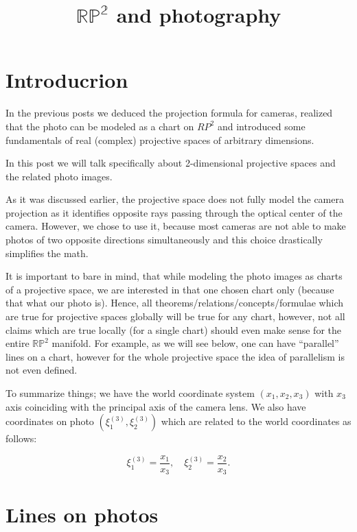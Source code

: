 \documentclass[a4paper,10pt]{article}
\title{$\mathbb{RP^2}$ and photography}
\author{}
\date{}
\begin{document}
\maketitle
\section{Introducrion}

In the previous posts we deduced the projection formula for cameras, realized that the photo can be modeled as a chart on $RP^2$ and introduced some fundamentals of real (complex) projective spaces of arbitrary dimensions. 

In this post we will talk specifically about 2-dimensional projective spaces and the related photo images. 

As it was discussed earlier, the projective space does not fully model the camera  projection as it identifies opposite rays passing through the optical center of  the camera. However, we chose to use it, because most cameras are not able to make photos of two opposite directions simultaneously and this choice drastically simplifies the math. 

It is important to bare in mind, that while modeling the photo images as charts of a projective space, we are interested in that one chosen chart only (because that what our photo is). Hence, all theorems/relations/concepts/formulae which are true for projective spaces globally will be true for any chart, however, not all claims which are true locally (for a single chart) should even make sense for the entire $\mathbb{RP}^2$ manifold. For example, as we will see below, one can have ``parallel'' lines on a chart, however for the whole projective space the idea of parallelism is not even defined.

To summarize things; we have the world coordinate system $(x_1, x_2, x_3)$ with $x_3$ axis coinciding with the principal axis of the camera lens. We also have coordinates on photo $(\xi_1^{(3)}, \xi_2^{(3)})$ which are related to the world coordinates as follows:

\begin{equation}
 \xi_1^{(3)} = \frac{x_1}{x_3}, \quad\xi_2^{(3)} = \frac{x_2}{x_3}.\label{photochart}
\end{equation}


\section{Lines on photos }
\end{document}

